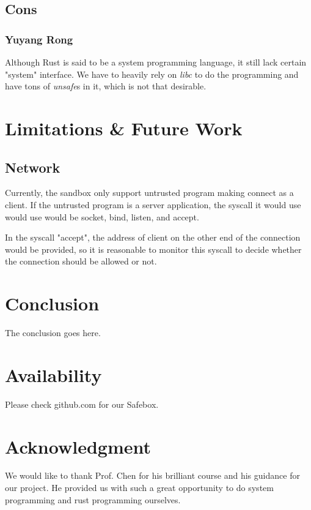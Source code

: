 \documentclass[conference,compsoc]{IEEEtran}
\begin{document}
	\subsection{Cons}
		\subsubsection{Yuyang Rong}
			\par
				Although Rust is said to be a system programming language, it still lack certain "system" interface.
				We have to heavily rely on \emph{libc} to do the programming and have tons of \emph{unsafe}s in it, which is not that desirable. 				

\section{Limitations \& Future Work}
	\subsection{Network}
		Currently, the sandbox only support untrusted program making connect as a client. If the untrusted program is a server application, the syscall it would use would use would be socket, bind, listen, and accept. 
		\par
		In the syscall "accept", the address of client on the other end of the connection would be provided, so it is reasonable to monitor this syscall to decide whether the connection should be allowed or not.


\section{Conclusion}

	The conclusion goes here.

\section{Availability}

	Please check github.com for our Safebox.

\section*{Acknowledgment}
	We would like to thank Prof. Chen for his brilliant course and his guidance for our project. He provided us with such a great opportunity to do system programming and rust programming ourselves. 






\end{document}
